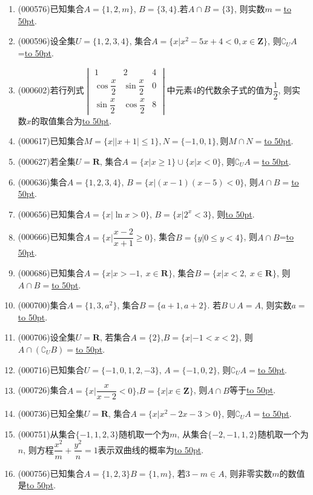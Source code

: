 \documentclass[10pt,a4paper]{article}
\newcommand{\blank}[1]{\underline{\hbox to #1pt{}}}
\begin{document}
\begin{enumerate}[1.]
\item {\tiny (000576)}已知集合$A=\{1,2,m\}$, $B=\{3,4\}$.若$A\cap B=\{3\}$, 则实数$m=$\blank{50}.
\item {\tiny (000596)}设全集$U=\{1,2,3,4\}$, 集合$A=\{x|x^2-5x+4<0,x\in \mathbf{Z}\}$, 则$\complement_U A$=\blank{50}.
\item {\tiny (000602)}若行列式$\begin{vmatrix} 1 & 2 & 4 \\ \cos \dfrac x2 & \sin \dfrac x2 & 0 \\ \sin \dfrac x2 & \cos \dfrac x2 & 8 \end{vmatrix}$中元素$4$的代数余子式的值为$\dfrac12$, 则实数$x$的取值集合为\blank{50}.
\item {\tiny (000617)}已知集合$M=\{x||x+1|\le 1\},N=\{-1,0,1\},$则$M\cap N=$\blank{50}.
\item {\tiny (000627)}若全集$U=\mathbf{R}$, 集合$A=\{x|x\ge 1\}\cup\{x|x<0\}$, 则$\complement_U A=$\blank{50}.
\item {\tiny (000636)}集合$A=\{1,2,3,4\}$, $B=\{x|(x-1)(x-5)<0\}$, 则$A\cap B=$\blank{50}.
\item {\tiny (000656)}已知集合$A=\{x|\ln x>0 \}$, $B=\{x|2^x<3\}$, 则\blank{50}.
\item {\tiny (000666)}已知集合$A=\{x|\dfrac{x-2}{x+1}\ge 0\}$, 集合$B=\{y|0 \le y<4\}$, 则$A\cap B$=\blank{50}.
\item {\tiny (000686)}已知集合$A=\{x|x>-1, \ x\in \mathbf{R}\}$, 集合$B=\{x|x<2, \ x\in \mathbf{R}\}$, 则$A\cap B=$\blank{50}.
\item {\tiny (000700)}集合$A=\{1,3,a^2\}$, 集合$B=\{a+1,a+2\}$. 若$B\cup A=A$, 则实数$a=$\blank{50}.
\item {\tiny (000706)}设全集$U=\mathbf{R}$, 若集合$A=\{2\}$,$B=\{x|-1<x<2\}$, 则$A\cap (\complement_UB)=$\blank{50}.
\item {\tiny (000716)}已知集合$U=\{-1,0,1,2,-3\}$, $A=\{-1,0,2\}$, 则$\complement_U A=$\blank{50}.
\item {\tiny (000726)}集合$A=\{x|\dfrac x{x-2}<0\}$,$B=\{x|x\in \mathbf{Z}\}$, 则$A\cap B$等于\blank{50}.
\item {\tiny (000736)}已知全集$U=\mathbf{R}$, 集合$A=\{x|x^2-2x-3>0\}$, 则$\complement_U A=$\blank{50}.
\item {\tiny (000751)}从集合$\{-1,1,2,3\}$随机取一个为$m$, 从集合$\{-2,-1,1,2\}$随机取一个为$n$, 则方程$\dfrac{x^2}m+\dfrac{y^2}n=1$表示双曲线的概率为\blank{50}.
\item {\tiny (000756)}已知集合$A=\{1,2,3\}B=\{1,m\}$, 若$3-m\in A$, 则非零实数$m$的数值是\blank{50}.

\end{enumerate}
\end{document}

